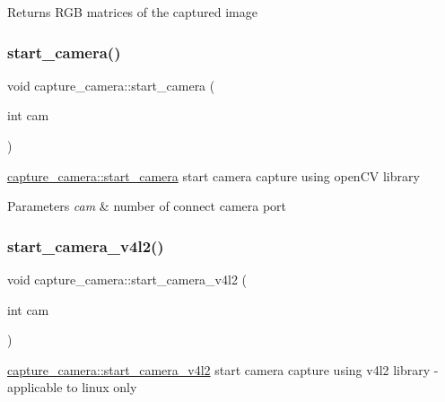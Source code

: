 \begin{DoxyReturn}{Returns}
R\+GB matrices of the captured image 
\end{DoxyReturn}
\mbox{\label{classcapture__camera_a1a47efefa0b820beacee88b5332dc01f}} 
\subsubsection{\texorpdfstring{start\+\_\+camera()}{start\_camera()}}
{\footnotesize\ttfamily void capture\+\_\+camera\+::start\+\_\+camera (\begin{DoxyParamCaption}\item[{int}]{cam }\end{DoxyParamCaption})}



\mbox{\hyperlink{classcapture__camera_a1a47efefa0b820beacee88b5332dc01f}{capture\+\_\+camera\+::start\+\_\+camera}} start camera capture using open\+CV library 


\begin{DoxyParams}{Parameters}
{\em cam} & number of connect camera port \\
\hline
\end{DoxyParams}
\mbox{\label{classcapture__camera_a73588d980bf53b1372b3f2b36363e726}} 
\subsubsection{\texorpdfstring{start\+\_\+camera\+\_\+v4l2()}{start\_camera\_v4l2()}}
{\footnotesize\ttfamily void capture\+\_\+camera\+::start\+\_\+camera\+\_\+v4l2 (\begin{DoxyParamCaption}\item[{int}]{cam }\end{DoxyParamCaption})}



\mbox{\hyperlink{classcapture__camera_a73588d980bf53b1372b3f2b36363e726}{capture\+\_\+camera\+::start\+\_\+camera\+\_\+v4l2}} start camera capture using v4l2 library -\/ applicable to linux only 


